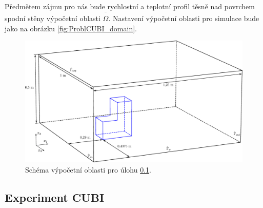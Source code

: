         P\v{r}edm\v{e}tem z\'{a}jmu pro n\'{a}s bude rychlostn\'{i} a teplotn\'{i} profil t\v{e}sn\v{e} nad povrchem spodn\'{i} st\v{e}ny v\'{y}po\v{c}etn\'{i} oblasti $\overline{\hat{\Omega}}$. Nastaven\'{i} v\'{y}po\v{c}etn\'{i} oblasti pro simulace bude jako na obr\'{a}zku \ref{fig:ProblCUBI_domain}.


        \begin{figure}[H]
            \centering
            \includegraphics[width=\textwidth]{Img/Kapitola4/CUBI_domain.pdf}
            \caption{Sch\'{e}ma v\'{y}po\v{c}etn\'{i} oblasti pro \'{u}lohu \ref{sub:ProbCUBI}.}
            \label{fig:CUBI_domain}
        \end{figure}

        \subsection{Experiment CUBI}
        \label{sub:ProbCUBI}

